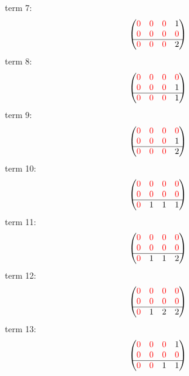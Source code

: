 \documentclass{article}
\begin{document}
term 7:
$$\begin{pmatrix}{\color{red} 0} & {\color{red} 0} & {\color{red} 0} & 1\\
{\color{red} 0} & {\color{red} 0} & {\color{red} 0} & {\color{red} 0}\\
\hline{\color{red} 0} & {\color{red} 0} & {\color{red} 0} & 2\\
\end{pmatrix}$$
term 8:
$$\begin{pmatrix}{\color{red} 0} & {\color{red} 0} & {\color{red} 0} & {\color{red} 0}\\
{\color{red} 0} & {\color{red} 0} & {\color{red} 0} & 1\\
\hline{\color{red} 0} & {\color{red} 0} & {\color{red} 0} & 1\\
\end{pmatrix}$$
term 9:
$$\begin{pmatrix}{\color{red} 0} & {\color{red} 0} & {\color{red} 0} & {\color{red} 0}\\
{\color{red} 0} & {\color{red} 0} & {\color{red} 0} & 1\\
\hline{\color{red} 0} & {\color{red} 0} & {\color{red} 0} & 2\\
\end{pmatrix}$$
term 10:
$$\begin{pmatrix}{\color{red} 0} & {\color{red} 0} & {\color{red} 0} & {\color{red} 0}\\
{\color{red} 0} & {\color{red} 0} & {\color{red} 0} & {\color{red} 0}\\
\hline{\color{red} 0} & 1 & 1 & 1\\
\end{pmatrix}$$
term 11:
$$\begin{pmatrix}{\color{red} 0} & {\color{red} 0} & {\color{red} 0} & {\color{red} 0}\\
{\color{red} 0} & {\color{red} 0} & {\color{red} 0} & {\color{red} 0}\\
\hline{\color{red} 0} & 1 & 1 & 2\\
\end{pmatrix}$$
term 12:
$$\begin{pmatrix}{\color{red} 0} & {\color{red} 0} & {\color{red} 0} & {\color{red} 0}\\
{\color{red} 0} & {\color{red} 0} & {\color{red} 0} & {\color{red} 0}\\
\hline{\color{red} 0} & 1 & 2 & 2\\
\end{pmatrix}$$
term 13:
$$\begin{pmatrix}{\color{red} 0} & {\color{red} 0} & {\color{red} 0} & 1\\
{\color{red} 0} & {\color{red} 0} & {\color{red} 0} & {\color{red} 0}\\
\hline{\color{red} 0} & {\color{red} 0} & 1 & 1\\
\end{pmatrix}$$
\end{document}
